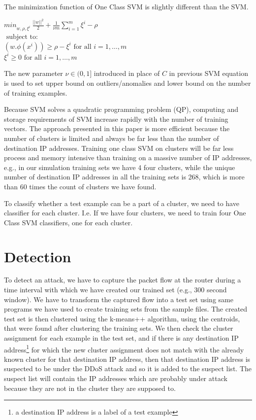 \documentclass[12pt,oneside,a4paper]{article}
\begin{document}
The minimization function of One Class SVM is slightly different than the SVM. \cite{svm}

\begin{center}
  ${min}_{w,\rho,\xi^i} \ \frac{||w||^2}{2} + \frac{1}{\nu m} \sum_{i=1}^m \xi^i - \rho$ \\
  $\mbox{ subject to: }$ \\
  $(w.\phi(x^i)) \geq \rho - \xi^i \mbox{ for all } i = 1, \dots, m$ \\
  \hspace{2cm} $\xi^i \geq 0 \mbox{ for all } i = 1, \dots, m$ \\
\end{center}

The new parameter $\nu \in (0,1]$ introduced in place of $C$ in previous SVM equation is used to set upper bound on outliers/anomalies and lower bound on the number of training examples.

Because SVM solves a quadratic programming problem (QP), computing and storage requirements of SVM increase rapidly with the number of training vectors. The approach presented in this paper is more efficient because the number of clusters is limited and always be far less than the number of destination IP addresses. Training one class SVM on clusters will be far less process and memory intensive than training on a massive number of IP addresses, e.g., in our simulation training sets we have 4 four clusters, while the unique number of destination IP addresses in all the training sets is 268, which is more than 60 times the count of clusters we have found.

To classify whether a test example can be a part of a cluster, we need to have classifier for each cluster. I.e. If we have four clusters, we need to train four One Class SVM classifiers, one for each cluster.
\pagebreak
\section{Detection} \label{sec:Detection}

To detect an attack, we have to capture the packet flow at the router during a time interval with which we have created our trained set (e.g., 300 second window). We have to transform the captured flow into a test set using same programs we have used to create training sets from the sample files. The created test set is then clustered using the k-means++ algorithm, using the centroids, that were found after clustering the training sets. We then check the cluster assignment for each example in the test set, and if there is any destination IP address\footnote{a destination IP address is a label of a test example} for which the new cluster assignment does not match with the already known cluster for that destination IP address, then that destination IP address is suspected to be under the DDoS attack and so it is added to the suspect list. The suspect list will contain the IP addresses which are probably under attack because they are not in the cluster they are supposed to.
\end{document}

